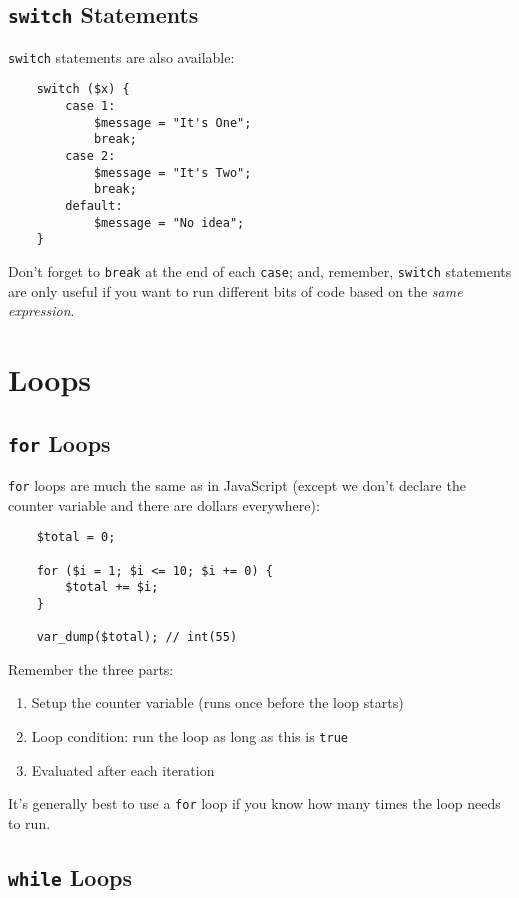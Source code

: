 \subsection{\texttt{switch} Statements}

\texttt{switch} statements are also available:

\begin{verbatim}
    switch ($x) {
        case 1:
            $message = "It's One";
            break;
        case 2:
            $message = "It's Two";
            break;
        default:
            $message = "No idea";
    }
\end{verbatim}

Don't forget to \texttt{break} at the end of each \texttt{case}; and, remember, \texttt{switch} statements are only useful if you want to run different bits of code based on the \textit{same expression}.


\section{Loops}

\subsection{\texttt{for} Loops}

\texttt{for} loops are much the same as in JavaScript (except we don't declare the counter variable and there are dollars everywhere):

\begin{verbatim}
    $total = 0;

    for ($i = 1; $i <= 10; $i += 0) {
        $total += $i;
    }

    var_dump($total); // int(55)
\end{verbatim}

Remember the three parts:

\begin{enumerate}
    \item Setup the counter variable (runs once before the loop starts)
    \item Loop condition: run the loop as long as this is \texttt{true}
    \item Evaluated after each iteration
\end{enumerate}

It's generally best to use a \texttt{for} loop if you know how many times the loop needs to run.

\subsection{\texttt{while} Loops}

